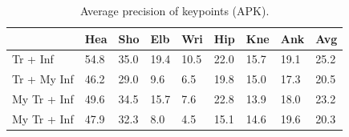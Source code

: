 \documentclass[10pt,twocolumn,letterpaper]{article}
\begin{document}
\begin{table}
  \begin{center}
    \begin{tabular}{|p{2.2cm}|p{0.5cm}|p{0.5cm}|p{0.5cm}|p{0.5cm}|p{0.5cm}|p{0.5cm}|p{0.5cm}||p{0.5cm}|}
      \hline
      		                                         & Hea  & Sho  & Elb  & Wri  & Hip  & Kne  & Ank  & Avg \\ \hline
      \hline
      \cite{Yang_PAMI2011} Tr + \cite{Yang_PAMI2011} Inf & 54.8 & 35.0 & 19.4 & 10.5 & 22.0 & 15.7 & 19.1 & 25.2 \\ \hline
      \cite{Yang_PAMI2011} Tr + My Inf                   & 46.2 & 29.0 &  9.6 &  6.5 & 19.8 & 15.0 & 17.3 & 20.5 \\ \hline
      My Tr + \cite{Yang_PAMI2011} Inf			 & 49.6 & 34.5 & 15.7 &  7.6 & 22.8 & 13.9 & 18.0 & 23.2 \\ \hline
      My Tr + \cite{Yang_PAMI2011} Inf			 & 47.9 & 32.3 &  8.0 &  4.5 & 15.1 & 14.6 & 19.6 & 20.3 \\ \hline
    \end{tabular}
  \end{center}
  \caption{Average precision of keypoints (APK).}
\end{table}
\end{document}
